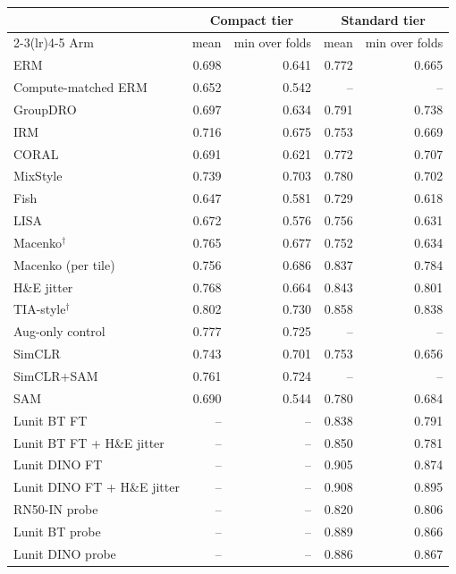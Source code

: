 \begin{tabular*}{\tblwidth}{@{\extracolsep{\fill}}lrrrr@{}}
\toprule
 & \multicolumn{2}{c}{Compact tier} & \multicolumn{2}{c}{Standard tier} \\
\cmidrule(lr){2-3}\cmidrule(lr){4-5}
Arm & mean & min over folds & mean & min over folds \\
\midrule
ERM & 0.698 & 0.641 & 0.772 & 0.665 \\
Compute-matched ERM & 0.652 & 0.542 & -- & -- \\
GroupDRO & 0.697 & 0.634 & 0.791 & 0.738 \\
IRM & 0.716 & 0.675 & 0.753 & 0.669 \\
CORAL & 0.691 & 0.621 & 0.772 & 0.707 \\
MixStyle & 0.739 & 0.703 & 0.780 & 0.702 \\
Fish & 0.647 & 0.581 & 0.729 & 0.618 \\
LISA & 0.672 & 0.576 & 0.756 & 0.631 \\
Macenko$^{\dagger}$ & 0.765 & 0.677 & 0.752 & 0.634 \\
Macenko (per tile) & 0.756 & 0.686 & 0.837 & 0.784 \\
H\&E jitter & 0.768 & 0.664 & 0.843 & 0.801 \\
TIA-style$^{\dagger}$ & 0.802 & 0.730 & 0.858 & 0.838 \\
Aug-only control & 0.777 & 0.725 & -- & -- \\
SimCLR & 0.743 & 0.701 & 0.753 & 0.656 \\
SimCLR+SAM & 0.761 & 0.724 & -- & -- \\
SAM & 0.690 & 0.544 & 0.780 & 0.684 \\
Lunit BT FT & -- & -- & 0.838 & 0.791 \\
Lunit BT FT + H\&E jitter & -- & -- & 0.850 & 0.781 \\
Lunit DINO FT & -- & -- & 0.905 & 0.874 \\
Lunit DINO FT + H\&E jitter & -- & -- & 0.908 & 0.895 \\
RN50-IN probe & -- & -- & 0.820 & 0.806 \\
Lunit BT probe & -- & -- & 0.889 & 0.866 \\
Lunit DINO probe & -- & -- & 0.886 & 0.867 \\
\bottomrule
\end{tabular*}
